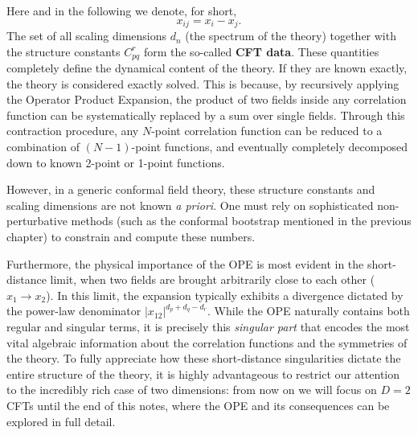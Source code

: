 Here and in the following we denote, for short,
\[
    x_{ij}=x_{i}-x_{j}.
\]
The set of all scaling dimensions \(d_n\) (the spectrum of the theory) together with the structure constants \(C_{pq}^{r}\) form the so-called \textbf{CFT data}. These quantities completely define the dynamical content of the theory. If they are known exactly, the theory is considered exactly solved. This is because, by recursively applying the Operator Product Expansion, the product of two fields inside any correlation function can be systematically replaced by a sum over single fields. Through this contraction procedure, any \(N\)-point correlation function can be reduced to a combination of \((N-1)\)-point functions, and eventually completely decomposed down to known 2-point or 1-point functions.

However, in a generic conformal field theory, these structure constants and scaling dimensions are not known \textit{a priori}. One must rely on sophisticated non-perturbative methods (such as the conformal bootstrap mentioned in the previous chapter) to constrain and compute these numbers.

Furthermore, the physical importance of the OPE is most evident in the short-distance limit, when two fields are brought arbitrarily close to each other (\(x_1 \to x_2\)). In this limit, the expansion typically exhibits a divergence dictated by the power-law denominator \(|x_{12}|^{d_{p}+d_{q}-d_{r}}\). While the OPE naturally contains both regular and singular terms, it is precisely this \textit{singular part} that encodes the most vital algebraic information about the correlation functions and the symmetries of the theory. To fully appreciate how these short-distance singularities dictate the entire structure of the theory, it is highly advantageous to restrict our attention to the incredibly rich case of two dimensions: from now on we will focus on \(D=2\) CFTs until the end of this notes, where the OPE and its consequences can be explored in full detail.
